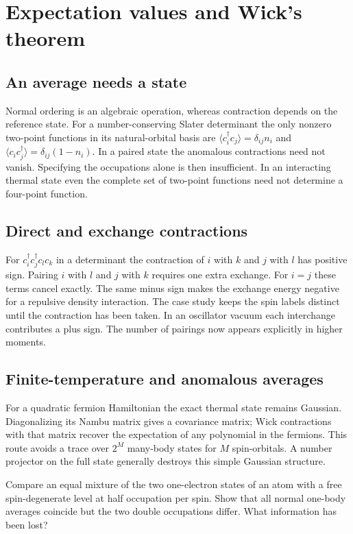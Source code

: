 \chapter{Expectation values and Wick's theorem}
\section{An average needs a state}
Normal ordering is an algebraic operation, whereas contraction depends
on the reference state. For a number-conserving Slater determinant the
only nonzero two-point functions in its natural-orbital basis are
$\langle c_i^\dagger c_j\rangle=\delta_{ij}n_i$ and
$\langle c_i c_j^\dagger\rangle=\delta_{ij}(1-n_i)$. In a paired
state the anomalous contractions need not vanish. Specifying the
occupations alone is then insufficient. In an interacting thermal
state even the complete set of two-point functions need not determine
a four-point function.

\section{Direct and exchange contractions}
For $c_i^\dagger c_j^\dagger c_l c_k$ in a determinant the contraction
of $i$ with $k$ and $j$ with $l$ has positive sign. Pairing $i$ with
$l$ and $j$ with $k$ requires one extra exchange. For $i=j$ these
terms cancel exactly. The same minus sign makes the exchange energy
negative for a repulsive density interaction. The case study keeps
the spin labels distinct until the contraction has been taken.
In an oscillator vacuum each interchange contributes a plus sign.
The number of pairings now appears explicitly in higher moments.

\section{Finite-temperature and anomalous averages}
For a quadratic fermion Hamiltonian the exact thermal state remains
Gaussian. Diagonalizing its Nambu matrix gives a covariance matrix;
Wick contractions with that matrix recover the expectation of any
polynomial in the fermions. This route avoids a trace over $2^M$
many-body states for $M$ spin-orbitals. A number projector on the full
state generally destroys this simple Gaussian structure.
\begin{exercise}\label{ex:wick}
Compare an equal mixture of the two one-electron states of an atom
with a free spin-degenerate level at half occupation per spin.
Show that all normal one-body averages coincide but the two double
occupations differ. What information has been lost?
\end{exercise}
